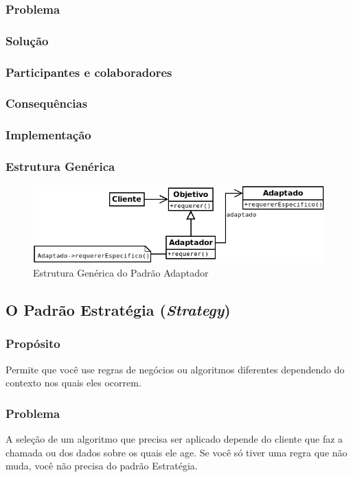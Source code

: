 \subsubsection{Problema}
\subsubsection{Solução}
\subsubsection{Participantes e colaboradores}
\subsubsection{Consequências}
\subsubsection{Implementação}
\subsubsection{Estrutura Genérica}

\begin{figure}[h]
\begin{center}
\includegraphics[scale=0.6]{adaptador.png}
\caption{Estrutura Genérica do Padrão Adaptador}\label{fig:adaptador}
\end{center}
\end{figure}

\subsection{O Padrão Estratégia (\textit{Strategy})}
\subsubsection{Propósito}
Permite que você use regras de negócios ou algoritmos diferentes dependendo do contexto nos quais eles ocorrem.

\subsubsection{Problema}
A seleção de um algoritmo que precisa ser aplicado depende do cliente que faz a chamada ou dos dados sobre os quais ele age. Se você só tiver uma regra que não muda, você não precisa do padrão Estratégia.


